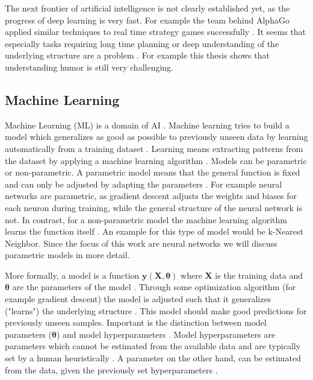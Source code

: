 \documentclass[draft,final,oneside]{vutinfth} %
\begin{document}
The next frontier of artificial intelligence is not clearly established yet, as the progress of deep learning is very fast. For example the team behind AlphaGo applied similar techniques to real time strategy games successfully \cite{arulkumaran2019alphastar}. It seems that especially tasks requiring long time planning or deep understanding of the underlying structure are a problem \cite{atariplaying}. For example this thesis shows that understanding humor is still very challenging.


\subsection{Machine Learning}

Machine Learning (ML) is a domain of AI \cite{aimodern}. Machine learning tries to build a model which generalizes as good as possible to previously unseen data by learning automatically from a training dataset \cite{bishop}. Learning means extracting patterns from the dataset by applying a machine learning algorithm \cite{bishop}. Models can be parametric or non-parametric. A parametric model means that the general function is fixed and can only be adjusted by adapting the parameters \cite{aimodern}. For example neural networks are parametric, as gradient descent adjusts the weights and biases for each neuron during training, while the general structure of the neural network is not. In contrast, for a non-parametric model the machine learning algorithm learns the function itself \cite{aimodern}. An example for this type of model would be k-Nearest Neighbor.  Since the focus of this work are neural networks we will discuss parametric models in more detail.

More formally, a model is a function $\boldsymbol{y}(\boldsymbol{X}, \boldsymbol{\theta})$ where $\boldsymbol{X}$ is the training data and $\boldsymbol{\theta}$ are the parameters of the model \cite{bishop}. Through some optimization algorithm (for example gradient descent) the model is adjusted such that it generalizes ("learns") the underlying structure \cite{anintroductiontoneuralnetworks}. This model should make good predictions for previously unseen samples. Important is the distinction between model parameters ($\boldsymbol{\theta}$) and model hyperparameters \cite{aimodern}. Model hyperparameters are parameters which cannot be estimated from the available data and are typically set by a human heuristically \cite{hyperparameter}. A parameter on the other hand, can be estimated from the data, given the previously set hyperparameters \cite{anintroductiontoneuralnetworks}.
\end{document}
